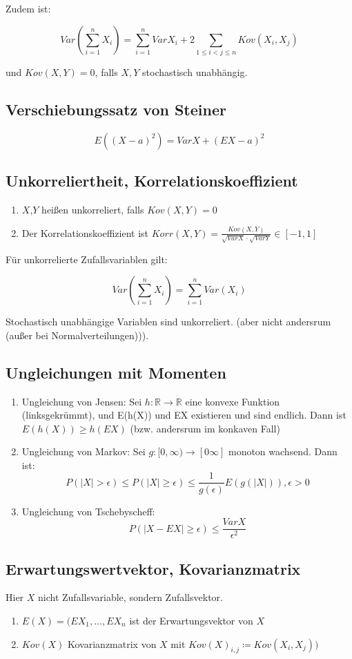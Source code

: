 \documentclass{scrartcl}%
\begin{document}
Zudem ist:

\[Var(\sum\limits_{i=1}^n X_i) = \sum\limits_{i=1}^n Var X_i + 2 \sum\limits_{1\leq i < j \leq n} Kov(X_i,X_j)\]

und $Kov(X,Y) = 0$, falls $X,Y$ stochastisch unabhängig.
\subsection{Verschiebungssatz von Steiner}
\[E((X-a)^2) = Var X + (EX-a)^2\]

\subsection{Unkorreliertheit, Korrelationskoeffizient}
\begin{enumerate}
	\item{$X$,$Y$ heißen unkorreliert, falls $Kov(X,Y) = 0$}
	\item{Der Korrelationskoeffizient ist $Korr(X,Y) = \frac{Kov(X,Y)}{\sqrt{Var X} \cdot \sqrt{Var Y}} \in [-1,1]$}
\end{enumerate}
Für unkorrelierte Zufallsvariablen gilt:

\[Var (\sum\limits_{i=1}^n X_i) = \sum\limits_{i=1}^n Var(X_i)\]

Stochastisch unabhängige Variablen sind unkorreliert. (aber nicht andersrum (außer bei Normalverteilungen))).

\subsection{Ungleichungen mit Momenten}
\begin{enumerate}
	\item{Ungleichung von Jensen: Sei $h:\mathbb{R} \rightarrow \mathbb{R}$ eine konvexe Funktion (linksgekrümmt), und E(h(X)) und EX existieren und sind endlich. Dann ist $E(h(X)) \geq h(EX)$ (bzw. andersrum im konkaven Fall)}
	\item{Ungleichung von Markov: Sei $g:[0,\infty) \rightarrow [0\infty]$ monoton wachsend. Dann ist: 
		\[P(\vert X\vert > \epsilon) \leq P(\vert X\vert \geq \epsilon) \leq \frac{1}{g(\epsilon)} E(g(\vert X\vert)), \epsilon > 0\]}
	\item{Ungleichung von Tschebyscheff: \[P(\vert X-EX\vert \geq \epsilon) \leq \frac{Var X}{\epsilon^2}\]}
\end{enumerate}

\subsection{Erwartungswertvektor, Kovarianzmatrix}
Hier $X$ nicht Zufallsvariable, sondern Zufallsvektor.
\begin{enumerate}
	\item{$E(X) = (EX_1, \ldots, EX_n$ ist der Erwartungsvektor von $X$}
	\item{$Kov (X)$ Kovarianzmatrix von $X$ mit $Kov(X)_{i,j} \coloneqq Kov(X_i,X_j))$}
\end{enumerate}
\end{document}

